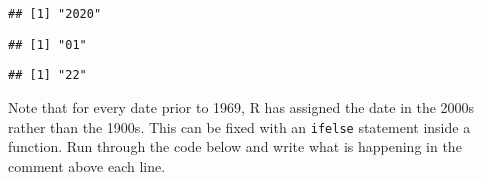 \documentclass[]{article}
\newenvironment{Shaded}{\begin{snugshade}}{\end{snugshade}}
\newcommand{\DataTypeTok}[1]{\textcolor[rgb]{0.13,0.29,0.53}{#1}}
\newcommand{\KeywordTok}[1]{\textcolor[rgb]{0.13,0.29,0.53}{\textbf{#1}}}
\newcommand{\NormalTok}[1]{#1}
\newcommand{\OperatorTok}[1]{\textcolor[rgb]{0.81,0.36,0.00}{\textbf{#1}}}
\newcommand{\StringTok}[1]{\textcolor[rgb]{0.31,0.60,0.02}{#1}}
\begin{document}
\begin{verbatim}
## [1] "2020"
\end{verbatim}

\begin{Shaded}
\end{Shaded}

\begin{verbatim}
## [1] "01"
\end{verbatim}

\begin{Shaded}
\end{Shaded}

\begin{verbatim}
## [1] "22"
\end{verbatim}

\begin{Shaded}
\end{Shaded}

Note that for every date prior to 1969, R has assigned the date in the
2000s rather than the 1900s. This can be fixed with an \texttt{ifelse}
statement inside a function. Run through the code below and write what
is happening in the comment above each line.
\end{document}
